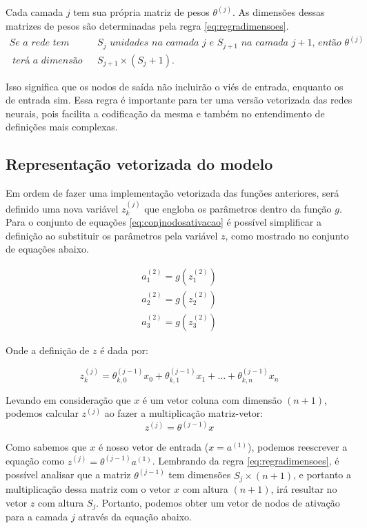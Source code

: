 Cada camada $j$ tem sua própria matriz de pesos $\theta^{(j)}$. As dimensões dessas matrizes de pesos são determinadas pela regra \ref{eq:regradimensoes}. 
\begin{align} 
\textit{Se a rede tem } & S_j \textit{ unidades na camada } j \textit{ e } S_{j+1} \textit{ na camada } j+1\textit{, então } \theta^{(j)} \nonumber \\ 
\textit{ terá a dimensão de } & S_{j+1} \times (S_j + 1)\textit{.} \label{eq:regradimensoes}
\end{align}

Isso significa que os nodos de saída não incluirão o viés de entrada, enquanto os de entrada sim. Essa regra é importante para ter uma versão vetorizada das redes neurais, pois facilita a codificação da mesma e também no entendimento de definições mais complexas.


\subsection{Representação vetorizada do modelo}

Em ordem de fazer uma implementação vetorizada das funções anteriores, será definido uma nova variável $z_k^{(j)}$ que engloba os parâmetros dentro da função $g$. Para o conjunto de equações \ref{eq:conjnodosativacao} é possível simplificar a definição ao substituir os parâmetros pela variável $z$, como mostrado no conjunto de equações abaixo.

\begin{align}
a_1^{(2)} = g(z_1^{(2)}) \nonumber \\
a_2^{(2)} = g(z_2^{(2)}) \nonumber \\
a_3^{(2)} = g(z_3^{(2)}) \nonumber
\end{align}

Onde a definição de $z$ é dada por:

\begin{equation}
z_k^{(j)} = \theta_{k,0}^{(j-1)}x_0 + \theta_{k,1}^{(j-1)}x_1 + \ldots + \theta_{k,n}^{(j-1)}x_n \nonumber
\end{equation}

Levando em consideração que $x$ é um vetor coluna com dimensão $(n+1)$, podemos calcular $z^{(j)}$ ao fazer a multiplicação matriz-vetor:
\begin{equation}
z^{(j)} = \theta^{(j-1)}x \nonumber
\end{equation}

Como sabemos que $x$ é nosso vetor de entrada ($x = a^{(1)}$), podemos reescrever a equação como $z^{(j)} = \theta^{(j-1)}a^{(1)}$. Lembrando da regra \ref{eq:regradimensoes}, é possível analisar que a matriz  $\theta^{(j-1)}$ tem dimensões $S_j \times (n+1)$, e portanto a multiplicação dessa matriz com o vetor $x$ com altura $(n+1)$, irá resultar no vetor $z$ com altura $S_j$. Portanto, podemos obter um vetor de nodos de ativação para a camada $j$ através da equação abaixo.

